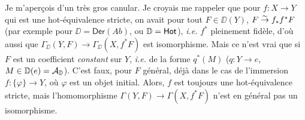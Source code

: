 Je m'aperçois d'un très gros canular. Je croyais me rappeler que pour $f : X \to Y$ qui est une hot-équivalence stricte, on avait pour tout $F \in \DD(Y)$, $F \overset{\sim}{\to} f_*f^*F$ (par exemple pour $\DD = \mathsf{Der}(\mathit{Ab})$, ou $\mathbb{D} = \mathsf{Hot}$), \textit{i.e.} $f^*$ pleinement fidèle, d'où aussi que $\Gamma_{\DD}(Y, F) \to \Gamma_{\DD}(X, f^*F)$ est isomorphisme. Mais ce n'est vrai que si $F$ est un coefficient \textit{constant} sur $Y$, \textit{i.e.} de la forme $q^*(M)$ ($q : Y \to e$, $M \in \mathbb{D}(e) = \mathcal{A}_{\mathbb{D}}$). C'est faux, pour $F$ général, déjà dans le cas de l'immersion $f : \{\varphi\} \to Y$, où $\varphi$ est un objet initial. Alors, $f$ est toujours une hot-équivalence stricte, mais l'homomorphisme $\Gamma(Y, F) \to \Gamma(X, f^*F)$ n'est en général pas un isomorphisme.

\clearpage
{}
\noindent{}

